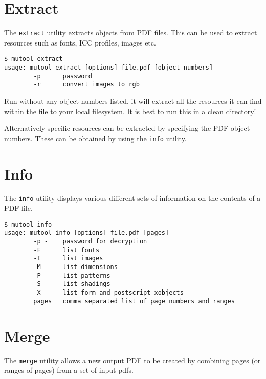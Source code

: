 \documentclass[oneside]{book}
\begin{document}
\section{Extract}

The \texttt{extract} utility extracts objects from PDF files. This can be used to extract resources such as fonts, ICC profiles, images etc.

\begin{lstlisting}
$ mutool extract
usage: mutool extract [options] file.pdf [object numbers]
        -p      password
        -r      convert images to rgb
\end{lstlisting}

Run without any object numbers listed, it will extract all the resources it can find within the file to your local filesystem. It is best to run this in a clean directory!

Alternatively specific resources can be extracted by specifying the PDF object numbers. These can be obtained by using the \texttt{info} utility.

\section{Info}

The \texttt{info} utility displays various different sets of information on the contents of a PDF file.

\begin{lstlisting}
$ mutool info
usage: mutool info [options] file.pdf [pages]
        -p -    password for decryption
        -F      list fonts
        -I      list images
        -M      list dimensions
        -P      list patterns
        -S      list shadings
        -X      list form and postscript xobjects
        pages   comma separated list of page numbers and ranges
\end{lstlisting}

\section{Merge}

The \texttt{merge} utility allows a new output PDF to be created by combining pages (or ranges of pages) from a set of input pdfs.
\end{document}
